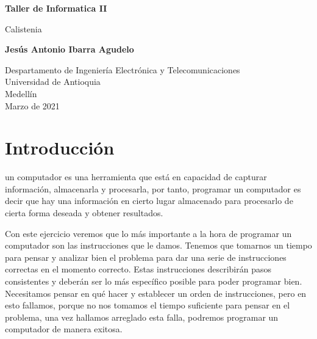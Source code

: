 \documentclass{article}
\begin{document}
\begin{titlepage}
    \begin{center}
        \vspace*{1cm}
            
        \Huge
        \textbf{Taller de Informatica II}
            
        \vspace{0.5cm}
        \LARGE
        Calistenia
            
        \vspace{1.5cm}
            
        \textbf{Jesús Antonio Ibarra Agudelo}
            
        \vfill
            
        \vspace{0.8cm}
            
        \Large
        Despartamento de Ingeniería Electrónica y Telecomunicaciones\\
        Universidad de Antioquia\\
        Medellín\\
        Marzo de 2021
            
    \end{center}
\end{titlepage}

\tableofcontents
\newpage
\section{Introducción}\label{intro}
un computador es una herramienta que está en capacidad de capturar información, almacenarla y procesarla, por tanto, programar un computador es decir que hay una información en cierto lugar almacenado para procesarlo de cierta forma deseada y obtener resultados.

Con este ejercicio veremos que lo más importante a la hora de programar un computador son las instrucciones que le damos. Tenemos que tomarnos un tiempo para pensar y analizar bien el problema para dar una serie de instrucciones correctas en el momento correcto. Estas instrucciones describirán pasos consistentes y deberán ser lo más específico posible para poder programar bien. Necesitamos pensar en qué hacer y establecer un orden de instrucciones, pero en esto fallamos, porque no nos tomamos el tiempo suficiente para pensar en el problema, una vez hallamos arreglado esta falla, podremos programar un computador de manera exitosa.

\newpage
\end{document}
